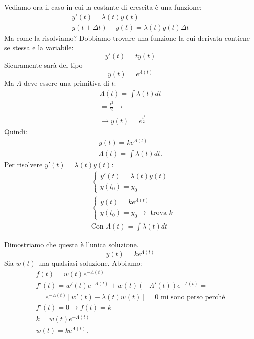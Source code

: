 Vediamo ora il caso in cui la costante di crescita è una funzione:
\begin{gather*}
    y'(t) = \lambda(t) y(t) \\
    y(t + \Delta t) - y(t) = \lambda(t)y(t)\Delta t
\end{gather*}
Ma come la risolviamo? Dobbiamo trovare una funzione la cui derivata contiene se stessa e la variabile:
\begin{equation*}
    y'(t) = ty(t)
\end{equation*}
Sicuramente sarà del tipo
\begin{equation*}
    y(t) = e^{\Lambda (t)}
\end{equation*}
Ma $\Lambda$ deve essere una primitiva di $t$:
\begin{gather*}
    \Lambda(t) = \int \lambda(t) dt \\
    = \frac{t^2}{2} \to \\
    \to y(t) = e^{\frac{t^2}{2}}
\end{gather*}
Quindi:
\begin{gather}
    y(t) = k e^{\Lambda(t)} \\
    \Lambda(t) = \int \lambda(t) dt.
\end{gather}
Per risolvere $y'(t) = \lambda(t)y(t)$:
\begin{align}
    &\begin{cases}
        y'(t) = \lambda(t)y(t) \\
        y(t_0) = y_0
    \end{cases} \\
    &\begin{cases}
        y(t) = ke^{\Lambda(t)} \\
        y(t_0) = y_0 \to \text{ trova } k
    \end{cases} \\
    &\text{Con } \Lambda(t) = \int \lambda(t)dt
\end{align}

\begin{dimostrazione}
    Dimostriamo che questa è l'unica soluzione.
    \begin{equation*}
        y(t) = ke^{\Lambda(t)}
    \end{equation*}
    Sia $w(t)$ una qualsiasi soluzione. Abbiamo:
    \begin{gather*}
        f(t) = w(t)e^{-\Lambda(t)} \\
        f'(t) = w'(t)e^{-\Lambda(t)} + w(t)(-\Lambda'(t))e^{-\Lambda(t)} = \\
        = e^{-\Lambda(t)}[w'(t)-\lambda(t)w(t)] = 0 \text{ mi sono perso perché} \\
        f'(t) = 0 \to f(t) = k \\
        k = w(t)e^{-\Lambda(t)} \\
        w(t) = ke^{\Lambda(t)}.
    \end{gather*}
\end{dimostrazione}


